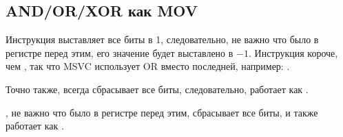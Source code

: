 \subsection{AND/OR/XOR как MOV}

Инструкция  выставляет все биты в 1, следовательно, не важно что было в регистре перед этим,
его значение будет выставлено в $-1$.
Инструкция  короче, чем , так что MSVC использует OR вместо последней,
например: .

Точно также,  всегда сбрасывает все биты, следовательно, работает как .

, не важно что было в регистре перед этим, сбрасывает все биты, и также работает как .

